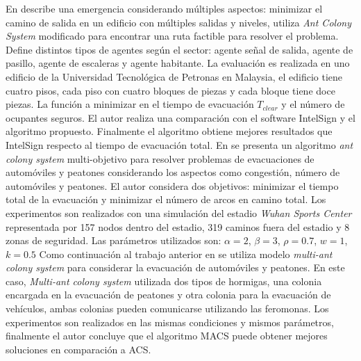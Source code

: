 En \cite{rahman2007feasible} describe una emergencia considerando múltiples aspectos: minimizar el camino de salida en un edificio con múltiples salidas y niveles, utiliza \textit{Ant Colony System} modificado para encontrar una ruta factible para resolver el problema. Define distintos tipos de agentes según el sector: agente señal de salida, agente de pasillo, agente de escaleras y agente habitante. La evaluación es realizada en uno edificio de la Universidad Tecnológica de Petronas en Malaysia, el edificio tiene cuatro pisos, cada piso con cuatro bloques de piezas y cada bloque tiene doce piezas. La función a minimizar en el tiempo de evacuación $T_{clear}$ y el número de ocupantes seguros. El autor realiza una comparación con el software IntelSign y el algoritmo propuesto. Finalmente el algoritmo obtiene mejores resultados que IntelSign respecto al tiempo de evacuación total.
En \cite{zong2010multi} se presenta un algoritmo \textit{ant colony system} multi-objetivo para resolver problemas de evacuaciones de automóviles y peatones  considerando los aspectos como congestión, número de automóviles y peatones. El autor considera dos objetivos: minimizar el tiempo total de la evacuación y minimizar el número de arcos en camino total. Los experimentos son realizados con una simulación del estadio \textit{Wuhan Sports Center} representada por 157 nodos dentro del estadio, 319 caminos fuera del estadio y 8 zonas de seguridad. Las parámetros utilizados son: $\alpha=2$, $\beta=3$, $\rho=0.7$, $w=1$, $k=0.5$
Como continuación al trabajo anterior en \cite{zong2010multiflow} se utiliza modelo \textit{multi-ant colony system} para considerar la evacuación de automóviles y peatones. En este caso, \textit{Multi-ant colony system} \cite{gambardella1999macs}utilizada dos tipos de hormigas, una colonia encargada en la evacuación de peatones y otra colonia para la evacuación de vehículos, ambas colonias pueden comunicarse utilizando las feromonas. Los experimentos son realizados en las mismas condiciones y mismos parámetros, finalmente el autor concluye que el algoritmo MACS puede obtener mejores soluciones en comparación a ACS.
